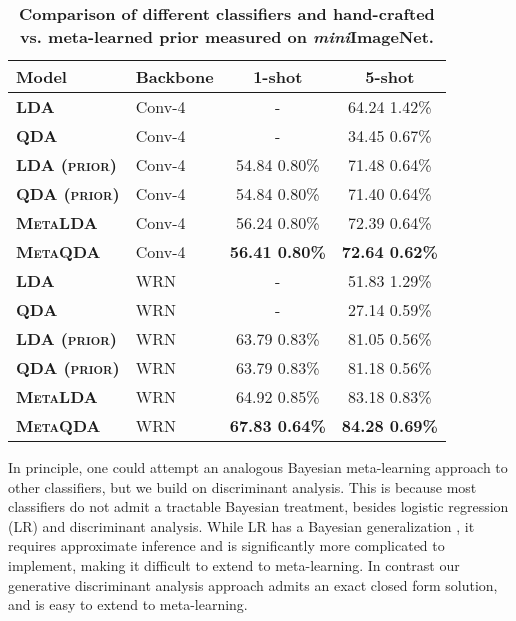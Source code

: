 \documentclass[10pt,twocolumn,letterpaper]{article}
\def\miniIN{\textit{mini}ImageNet}
\begin{document}
\setlength{\tabcolsep}{4.8pt}
\begin{table}[tb]
\centering
\footnotesize
\begin{tabular}{@{} llcc @{}}
\toprule
{\bf Model} & {\bf Backbone} & 1-shot & 5-shot \\
\midrule 

\textbf{\textsc{LDA}} & Conv-4 & - & 64.24  1.42\% \\
\textbf{\textsc{QDA}} & Conv-4 & - & 34.45  0.67\% \\
\textbf{\textsc{LDA (prior)}} & Conv-4 & 54.84  0.80\% & 71.48  0.64\% \\ 
\textbf{\textsc{QDA (prior)}} & Conv-4 & 54.84  0.80\% & 71.40  0.64\% \\
\textbf{\textsc{MetaLDA}} & Conv-4 & 56.24  0.80\% & 72.39  0.64\% \\ 
\textbf{\textsc{MetaQDA}} & Conv-4 & \bf{56.41  0.80\%} & \bf{72.64  0.62\%} \\ 
\midrule 
\textbf{\textsc{LDA}} & WRN & - & 51.83  1.29\% \\ 
\textbf{\textsc{QDA}} & WRN & - & 27.14  0.59\% \\
\textbf{\textsc{LDA (prior)}} & WRN & 63.79  0.83\% & 81.05  0.56\% \\ 
\textbf{\textsc{QDA (prior)}} & WRN & 63.79  0.83\% & 81.18  0.56\% \\ 
\textbf{\textsc{MetaLDA}} & WRN & 64.92  0.85\% & 83.18  0.83\% \\ 
\textbf{\textsc{MetaQDA}} & WRN & \bf{67.83  0.64\%} & \bf{84.28  0.69\%} \\ 

\bottomrule
\end{tabular}\caption{\small \small
\textbf{Comparison of different classifiers and hand-crafted vs. meta-learned prior measured on \miniIN. }
}
\label{tab:ablation1}
\end{table}




In principle, one could attempt an analogous Bayesian meta-learning approach to other classifiers, but we build on discriminant analysis. This is because most classifiers do not admit a tractable Bayesian treatment, besides logistic regression (LR) and discriminant analysis. While LR has a Bayesian generalization \cite{mackay1992bayesLR}, it requires approximate inference and is significantly more complicated to implement, making it difficult to extend to meta-learning. In contrast our generative discriminant analysis approach admits an exact closed form solution, and is easy to extend to meta-learning.
\end{document}
